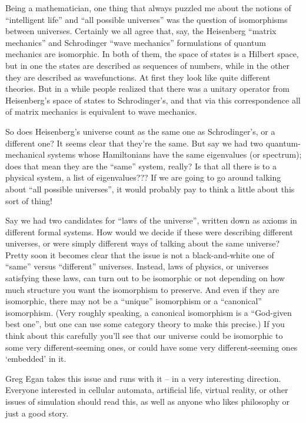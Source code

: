 \documentclass{article}
\begin{document}
Being a mathematician, one thing that always puzzled me about the
notions of ``intelligent life'' and ``all possible universes'' was the
question of isomorphisms between universes. Certainly we all agree that,
say, the Heisenberg ``matrix mechanics'' and Schrodinger ``wave
mechanics'' formulations of quantum mechanics are isomorphic. In both of
them, the space of states is a Hilbert space, but in one the states are
described as sequences of numbers, while in the other they are described
as wavefunctions. At first they look like quite different theories. But
in a while people realized that there was a unitary operator from
Heisenberg's space of states to Schrodinger's, and that via this
correspondence all of matrix mechanics is equivalent to wave mechanics.

So does Heisenberg's universe count as the same one as Schrodinger's, or
a different one? It seems clear that they're the same. But say we had
two quantum-mechanical systems whose Hamiltonians have the same
eigenvalues (or spectrum); does that mean they are the ``same'' system,
really? Is that all there is to a physical system, a list of
eigenvalues??? If we are going to go around talking about ``all possible
universes'', it would probably pay to think a little about this sort of
thing!

Say we had two candidates for ``laws of the universe'', written down as
axioms in different formal systems. How would we decide if these were
describing different universes, or were simply different ways of talking
about the same universe? Pretty soon it becomes clear that the issue is
not a black-and-white one of ``same'' versus ``different'' universes.
Instead, laws of physics, or universes satisfying these laws, can turn
out to be isomorphic or not depending on how much structure you want the
isomorphism to preserve. And even if they are isomorphic, there may not
be a ``unique'' isomorphism or a ``canonical'' isomorphism. (Very
roughly speaking, a canonical isomorphism is a ``God-given best one'',
but one can use some category theory to make this precise.) If you think
about this carefully you'll see that our universe could be isomorphic to
some very different-seeming ones, or could have some very
different-seeming ones `embedded' in it.

Greg Egan takes this issue and runs with it -- in a very interesting
direction. Everyone interested in cellular automata, artificial life,
virtual reality, or other issues of simulation should read this, as well
as anyone who likes philosophy or just a good story.
\end{document}
